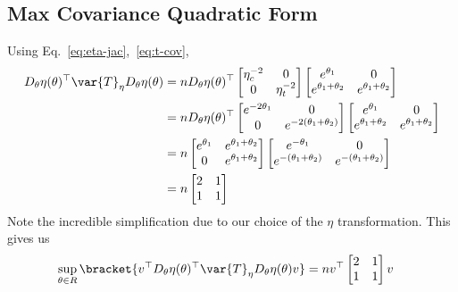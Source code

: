 \documentclass[10pt, a4paper]{article}
\begin{document}
\subsection{Max Covariance Quadratic Form}\label{ssec:max-cov-quad-form}

Using Eq.~\ref{eq:eta-jac},~\ref{eq:t-cov},
\begin{align*}
    D_\theta \eta(\theta)^\top 
    \var{T}_\eta 
    D_\theta \eta(\theta)
    &=
    n
    D_\theta \eta(\theta)^\top
    \begin{bmatrix}
        \eta_c^{-2} & 0 \\
        0 & \eta_t^{-2}
    \end{bmatrix}
    \begin{bmatrix}
        e^{\theta_1} & 0 \\
        e^{\theta_1+\theta_2} & e^{\theta_1+\theta_2}
    \end{bmatrix}
    \\&=
    n
    D_\theta \eta(\theta)^\top
    \begin{bmatrix}
        e^{-2\theta_1} & 0 \\
        0 & e^{-2(\theta_1+\theta_2)}
    \end{bmatrix}
    \begin{bmatrix}
        e^{\theta_1} & 0 \\
        e^{\theta_1+\theta_2} & e^{\theta_1+\theta_2}
    \end{bmatrix}
    \\&=
    n
    \begin{bmatrix}
        e^{\theta_1} & e^{\theta_1+\theta_2} \\
        0 & e^{\theta_1+\theta_2}
    \end{bmatrix}
    \begin{bmatrix}
        e^{-\theta_1} & 0 \\
        e^{-(\theta_1+\theta_2)} & e^{-(\theta_1+\theta_2)}
    \end{bmatrix}
    \\&=
    n
    \begin{bmatrix}
        2 & 1 \\
        1 & 1
    \end{bmatrix}
\end{align*}
Note the incredible simplification due to our choice of the $\eta$ transformation.
This gives us
\begin{align*}
    \sup\limits_{\theta \in R} \bracket{%
    v^\top
        D_\theta \eta(\theta)^\top 
        \var{T}_\eta 
        D_\theta \eta(\theta)
    v
    }
    &=
    n v^\top
    \begin{bmatrix}
        2 & 1 \\
        1 & 1
    \end{bmatrix}
    v
\end{align*}
\end{document}
